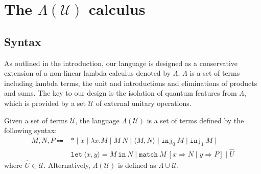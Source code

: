 \section{\texorpdfstring{The $\Lambda(\mathcal{U})$ calculus}{The Lambda(U) calculus}}
\subsection{Syntax}
As outlined in the introduction, our language is designed as a conservative extension of a non-linear lambda calculus denoted by $\Lambda$. $\Lambda$ is a set of terms including lambda terms, the unit and introductions and eliminations of products and sums. The key to our design is the isolation of quantum features from $\Lambda$, which is provided by a set $\mathcal{U}$ of external unitary operations.
\begin{dfn}
  Given a set of terms $\mathcal{U}$, the language $\Lambda(\mathcal{U})$ is a set of terms defined by the following syntax:
  \begin{equation*}
    \begin{array}{rl}
      M, N, P \Coloneqq & *\mid x\mid\lambda x. M\mid M\ N\mid\langle M, N\rangle\mid\texttt{inj}_0\ M\mid\texttt{inj}_1\ M \mid \\& \texttt{let}\ \langle x, y\rangle=M\ \texttt{in}\ N\mid\texttt{match}\ M\ [x\Rightarrow N\mid y\Rightarrow P]\mid\hat{U}
    \end{array}
  \end{equation*}
  where $\hat{U}\in\mathcal{U}$. Alternatively, $\Lambda(\mathcal{U})$ is defined as $\Lambda\cup\mathcal{U}$.
\end{dfn}

